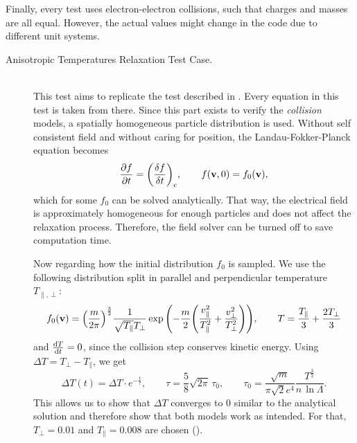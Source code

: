 Finally, every test uses electron-electron collisions, such that charges and masses are all equal. However, the actual values might change in the code due to different unit systems.
\begin{description}
    \item[Anisotropic Temperatures Relaxation Test Case.] \hfill \\
    This test aims to replicate the test described in \cite[4312]{Wang2008}. Every equation in this test is taken from there. Since this part exists to verify the \textit{collision} models, a spatially homogeneous particle distribution is used. Without self consistent field and without caring for position, the Landau-Fokker-Planck equation becomes
    $$
    \pdv{f}{t} = \qty(\fdv{f}{t})_\mathrm{c}, \qquad f(\mathbf{v}, 0) = f_0(\mathbf{v}),
    $$
    which for some $f_0$ can be solved analytically. That way, the electrical field is approximately homogeneous for enough particles and does not affect the relaxation process. Therefore, the field solver can be turned off to save computation time. 

    Now regarding how the initial distribution $f_0$ is sampled. We use the following distribution split in parallel and perpendicular temperature $T_{\parallel, \perp}$:
    \begin{equation}
        f_0(\mathbf{v}) = \qty(\frac{m}{2\pi})^\frac{3}{2} \frac{1}{\sqrt{T_\parallel }T_\perp} \exp\qty( - \frac{m}{2} \qty( \frac{v_\parallel^2}{T_\parallel^2} + \frac{v_\perp^2}{T_\perp^2}) ) , \qquad T = \frac{T_\parallel}{3} + \frac{2 T_\perp}{3} \label{eq:methodology:initial_distr}
    \end{equation}
    and $\dv{T}{t} = 0$, since the collision step conserves kinetic energy. Using $\Delta T = T_\perp - T_\parallel$, we get
    \begin{equation}
        \Delta T(t) = \Delta T \cdot e^{-\frac{t}{\tau}}, 
        \qquad \tau = \frac{5}{8} \sqrt{2\pi} \,\tau_0,
        \qquad \tau_0 = \frac{\sqrt{m}}{\pi \sqrt{2} e^4} \frac{T^{\frac{3}{2}}}{n\,\ln\Lambda} . \label{eq:methodology:trubnikov_analytical_sol}
    \end{equation}
    This allows us to show that $\Delta T$ converges to $0$ similar to the analytical solution and therefore show that both models work as intended. For that, $T_\perp = 0.01$ and $T_\parallel = 0.008$ are chosen (\cite[4314, 4317]{Wang2008}). 


\end{description}
